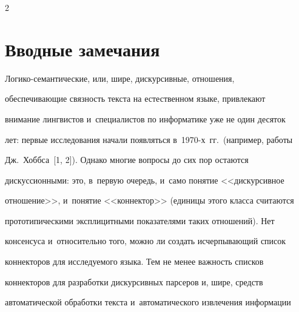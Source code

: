 \vspace*{4pt}













\thispagestyle{headings}





\begin{multicols}{2}





\label{st\stat}





\section{Вводные замечания}





\vspace*{-6pt}





Логико-семантические, или, шире, дискурсивные, отношения, 


обеспечивающие связность текста на естественном языке, привлекают 


внимание лингвистов и~специалистов по информатике уже не один десяток 


лет: первые исследования начали появляться в~1970-х~гг.\ (например, работы 


Дж.~Хоббса~[1, 2]). Однако многие вопросы до сих пор остаются 


дискуссионными: это, в~первую очередь, и~само понятие <<дискурсивное 


отношение>>, и~понятие <<коннектор>> (единицы этого класса считаются 


прототипическими эксплицитными показателями таких отношений). Нет 


консенсуса и~относительно того, можно ли создать исчерпывающий список 


коннекторов для исследуемого языка. Тем не менее важность списков 


коннекторов для разработки дискурсивных парсеров и, шире, средств 


автоматической обработки текста и~автоматического извлечения информации 



\end{multicols}
